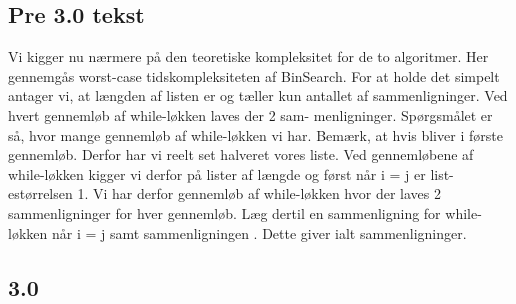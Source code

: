 \documentclass{article}
\begin{document}
\subsection{\textbf{Pre 3.0 tekst}}
\begin{Maple Normal}{
Vi kigger nu nærmere på den teoretiske kompleksitet for de to algoritmer.\linebreak
Her gennemgås worst-case tidskompleksiteten af BinSearch. For at holde\linebreak
det simpelt antager vi, at længden af listen er 
 og tæller kun antallet\linebreak
af sammenligninger. Ved hvert gennemløb af while-løkken laves der 2 sam-\linebreak
menligninger. Spørgsmålet er så, hvor mange gennemløb af while-løkken vi\linebreak
har. Bemærk, at hvis 
 bliver 
 i første gennemløb. Derfor\linebreak
har vi reelt set halveret vores liste. Ved gennemløbene af while-løkken kigger\linebreak
vi derfor på lister af længde 
 og først når i = j er list-\linebreak
estørrelsen 1. Vi har derfor 
 gennemløb af while-løkken hvor der\linebreak
laves 2 sammenligninger for hver gennemløb. Læg dertil en sammenligning\linebreak
for while-løkken når i = j samt sammenligningen 
 . Dette giver ialt\linebreak
{}
 sammenligninger.\linebreak
}\end{Maple Normal}

\subsection{\textbf{3.0}}
\begin{Maple Normal}{
}\end{Maple Normal}
\end{document}
